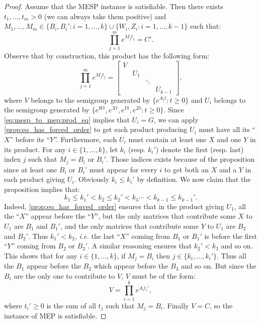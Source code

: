 \begin{proof}
Assume that the MESP instance is satisfiable. Then there exists $t_1,\ldots,t_m>0$ (we can always take them positive)
and $M_1,\ldots,M_m\in\big\{B_i,B_i':i=1,\ldots,k\}\cup\big\{W_i,Z_i:i=1,\ldots,k-1\big\}$
such that:
\begin{equation}\label{eq:mesp_to_mep:prod_eq}
\prod_{j=1}^me^{M_jt_j}=C'.
\end{equation}
Observe that by construction, this product has the following form:
\[\prod_{j=1}^me^{M_jt_j}=\begin{bmatrix}V&&&\\&U_1&&\\&&\ddots&\\&&&U_{k-1}\end{bmatrix},\]
where $V$ belongs to the semigroup generated by $\{e^{A_it}:t\geqslant0\}$ and $U_i$ belongs
to the semigroup generated by $\{e^{Wt},e^{Xt},e^{Yt},e^{Zt}:t\geqslant0\}$. Since
\eqref{eq:mesp_to_mep:prod_eq} implies that $U_i=G$, we can apply \cref{prop:eq_has_forced_order}
to get each product producing $U_i$ must have all its ``$X$'' before its ``$Y$''. Furthermore, each $U_i$
must contain at least one $X$ and one $Y$ in its product. For any $i\in\{1,\ldots,k\}$,
let $k_i$ (resp. $k_i'$) denote
the first (resp. last) index $j$ such that $M_j=B_i\text{ or }B_i'$. Those indices exists because
of the proposition since at least one $B_i$ or $B_i$' must appear for every $i$
to get both an $X$ and a $Y$ in each product giving $U_i$. Obviously $k_i\leqslant k_i'$
by definition. We now claim that the proposition implies that:
\[k_1\leqslant k_1'<k_2\leqslant k_2'<k_3\cdots<k_{k-1}\leqslant k_{k-1}'.\]
Indeed, \cref{prop:eq_has_forced_order} ensures that in the product giving $U_1$,
all the ``$X$'' appear before the ``$Y$'',
but the only matrices that contribute some $X$ to $U_1$ are $B_1$ and $B_1'$,
and the only matrices that contribute some $Y$ to $U_1$ are $B_2$ and $B_2'$.
Thus $k_1'<k_2$, \emph{i.e.} the last ``$X$'' coming from $B_1$ or $B_1'$ is before the first ``$Y$''
coming from $B_2$ or $B_2'$. A similar reasoning ensures that $k_2'<k_3$ and so on.
This shows that for any $i\in\{1,\ldots,k\}$, if $M_j=B_i$ then $j\in\{k_i,\ldots,k_i'\}$. Thus all
the $B_1$ appear before the $B_2$ which appear before the $B_3$ and so on.
But since the $B_i$ are the only one to contribute to $V$, $V$ must be of the form:
\[V=\prod_{i=1}^ke^{A_it_i'},\]
where $t_i'\geqslant0$ is the sum of all $t_j$ such that $M_j=B_i$.
Finally $V=C$, so the instance of MEP is satisfiable.

\end{proof}